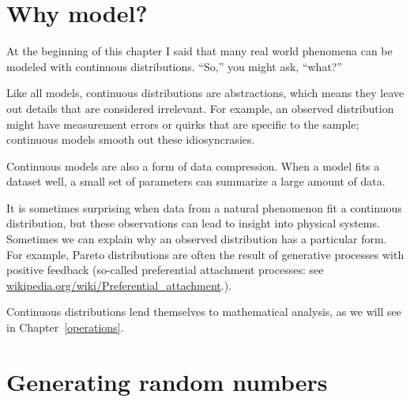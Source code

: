 \documentclass[12pt]{book}
\begin{document}
\section{Why model?}


At the beginning of this chapter I said that many real world phenomena
can be modeled with continuous distributions.  ``So,'' you might ask,
``what?''


Like all models, continuous distributions are abstractions, which
means they leave out details that are considered irrelevant.
For example, an observed distribution might have measurement errors
or quirks that are specific to the sample; continuous models smooth
out these idiosyncrasies.


Continuous models are also a form of data compression.  When a model
fits a dataset well, a small set of parameters can summarize a
large amount of data.



It is sometimes surprising when data from a natural phenomenon fit a
continuous distribution, but these observations can lead to insight
into physical systems.  Sometimes we can explain why an observed
distribution has a particular form.  For example, Pareto distributions
are often the result of generative processes with positive feedback
(so-called preferential attachment processes: see
\url{wikipedia.org/wiki/Preferential_attachment}.).




Continuous distributions lend themselves to mathematical analysis, as
we will see in Chapter~\ref{operations}.


\section{Generating random numbers}


\end{document}
